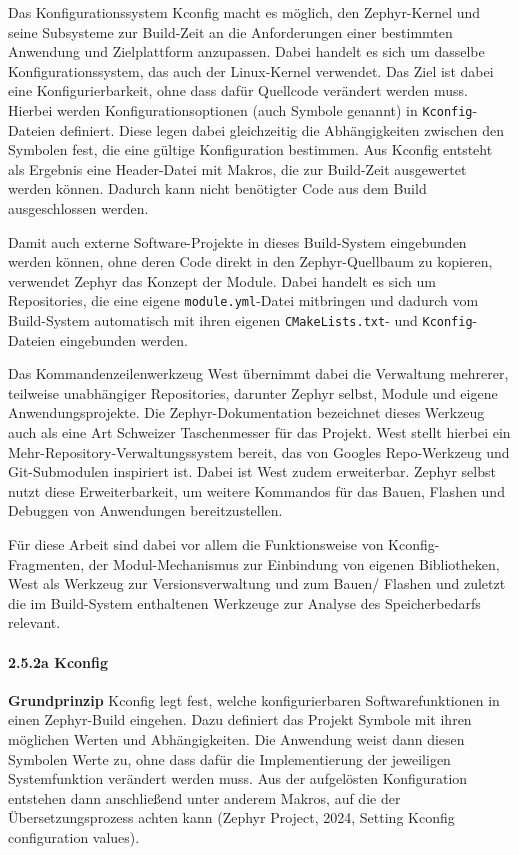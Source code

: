 Das Konfigurationssystem Kconfig macht es m{\"o}glich, den Zephyr-Kernel und seine Subsysteme zur Build-Zeit an die Anforderungen einer bestimmten Anwendung und Zielplattform anzupassen. Dabei handelt es sich um dasselbe Konfigurationssystem, das auch der Linux-Kernel verwendet. Das Ziel ist dabei eine Konfigurierbarkeit, ohne dass daf{\"u}r Quellcode ver{\"a}ndert werden muss. Hierbei werden Konfigurationsoptionen (auch \glqq{}Symbole\grqq{} genannt) in \lstinline[style=fileinline]|Kconfig|-Dateien definiert. Diese legen dabei gleichzeitig die Abh{\"a}ngigkeiten zwischen den Symbolen fest, die eine g{\"u}ltige Konfiguration bestimmen. Aus Kconfig entsteht als Ergebnis eine Header-Datei mit Makros, die zur Build-Zeit ausgewertet werden k{\"o}nnen. Dadurch kann nicht ben{\"o}tigter Code aus dem Build ausgeschlossen werden.

Damit auch externe Software-Projekte in dieses Build-System eingebunden werden k{\"o}nnen, ohne deren Code direkt in den Zephyr-Quellbaum zu kopieren, verwendet Zephyr das Konzept der Module. Dabei handelt es sich um Repositories, die eine eigene \lstinline[style=fileinline]|module.yml|-Datei mitbringen und dadurch vom Build-System automatisch mit ihren eigenen \lstinline[style=fileinline]|CMakeLists.txt|- und \lstinline[style=fileinline]|Kconfig|-Dateien eingebunden werden.

Das Kommandenzeilenwerkzeug West {\"u}bernimmt dabei die Verwaltung mehrerer, teilweise unabh{\"a}ngiger Repositories, darunter Zephyr selbst, Module und eigene Anwendungsprojekte. Die Zephyr-Dokumentation bezeichnet dieses Werkzeug auch als eine Art \glqq{}Schweizer Taschenmesser\grqq{} f{\"u}r das Projekt. West stellt hierbei ein Mehr-Repository-Verwaltungssystem bereit, das von Googles Repo-Werkzeug und Git-Submodulen inspiriert ist. Dabei ist West zudem erweiterbar. Zephyr selbst nutzt diese Erweiterbarkeit, um weitere Kommandos f{\"u}r das Bauen, Flashen und Debuggen von Anwendungen bereitzustellen.

F{\"u}r diese Arbeit sind dabei vor allem die Funktionsweise von Kconfig-Fragmenten, der Modul-Mechanismus zur Einbindung von eigenen Bibliotheken, West als Werkzeug zur Versionsverwaltung und zum Bauen/ Flashen und zuletzt die im Build-System enthaltenen Werkzeuge zur Analyse des Speicherbedarfs relevant.

\paragraph*{\textbf{2.5.2a Kconfig}}
\textbf{Grundprinzip} Kconfig legt fest, welche konfigurierbaren Softwarefunktionen in einen Zephyr-Build eingehen. Dazu definiert das Projekt Symbole mit ihren m{\"o}glichen Werten und Abh{\"a}ngigkeiten. Die Anwendung weist dann diesen Symbolen Werte zu, ohne dass daf{\"u}r die Implementierung der jeweiligen Systemfunktion ver{\"a}ndert werden muss. Aus der aufgel{\"o}sten Konfiguration entstehen dann anschlie{\ss}end unter anderem Makros, auf die der {\"U}bersetzungsprozess achten kann (Zephyr Project, 2024, \glqq{}Setting Kconfig configuration values\grqq{}).

